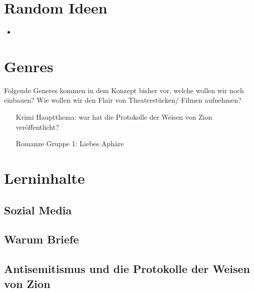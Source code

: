 \documentclass[12pt, a4paper, openany]{report}
\begin{document}
\chapter{Random Ideen}
\begin{itemize}
    \item 
\end{itemize}
\chapter{Genres}
Folgende Generes kommen in dem Konzept bisher vor, welche wollen wir noch einbauen? 
Wie wollen wir den Flair von Theaterstücken/ Filmen aufnehmen?
\begin{itemize}
    \item[Krimi] Hauptthema: war hat die Protokolle der Weisen von Zion veröffentlicht?
    \item[Romanze] Gruppe 1: Liebes Aphäre
\end{itemize}

\chapter{Lerninhalte}
\section{Sozial Media}
\section{Warum Briefe}
\section{Antisemitismus und die Protokolle der Weisen von Zion}

\printbibliography
\listoftodos
\end{document}

